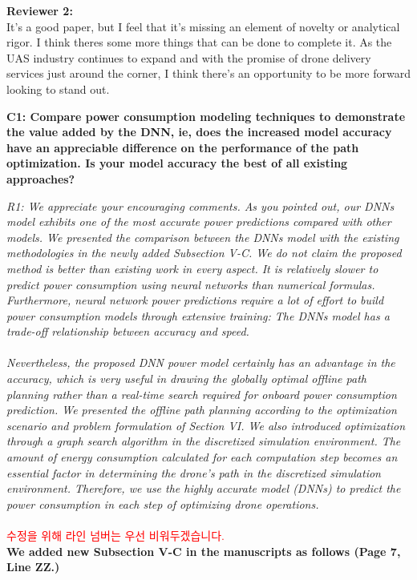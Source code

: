 \documentclass[onecolumn]{IEEEconf}
\begin{document}
\textbf{\large Reviewer 2:}\\
It's a good paper, but I feel that it's missing an element of novelty or analytical rigor.  I think theres some more things that can be done to complete it.
As the UAS industry continues to expand and with the promise of drone delivery services just around the corner, I think there's an opportunity to be more forward looking to stand out.
\begin{description}
    \item \textbf
	{
	C1: Compare power consumption modeling techniques to demonstrate the value added by the DNN, ie, does the increased model accuracy have an appreciable difference on the performance of the path optimization. Is your model accuracy the best of all existing approaches? 
	}
	\item \textit
	{
	R1: We appreciate your encouraging comments. As you pointed out, our DNNs model exhibits one of the most accurate power predictions compared with other models. We presented the comparison between the DNNs model with the existing methodologies in the newly added Subsection V-C. We do not claim the proposed method is better than existing work in every aspect. It is relatively slower to predict power consumption using neural networks than numerical formulas. Furthermore, neural network power predictions require a lot of effort to build power consumption models through extensive training: The DNNs model has a trade-off relationship between accuracy and speed.~\\ 
    ~\\
    Nevertheless, the proposed DNN power model certainly has an advantage in the accuracy, which is very useful in drawing the globally optimal offline path planning rather than a real-time search required for onboard power consumption prediction. We presented the offline path planning according to the optimization scenario and problem formulation of Section VI. We also introduced optimization through a graph search algorithm in the discretized simulation environment. The amount of energy consumption calculated for each computation step becomes an essential factor in determining the drone's path in the discretized simulation environment. Therefore, we use the highly accurate model (DNNs) to predict the power consumption in each step of optimizing drone operations. 
	}
	~\\
    ~\\
    \textcolor{red}{수정을 위해 라인 넘버는 우선 비워두겠습니다.}\\
	\textbf{We added new Subsection V-C in the manuscripts as follows (Page 7, Line ZZ.)}\\

\end{description}
\end{document}
